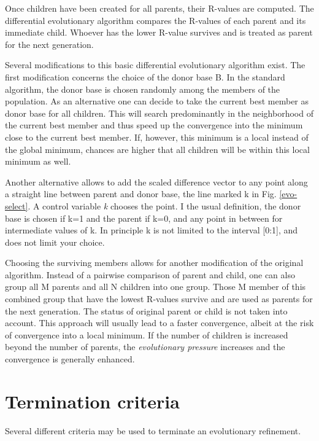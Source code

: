 Once children have been created for all parents, their R-values are 
computed. The differential evolutionary algorithm compares the 
R-values of each parent and its immediate child. Whoever has the 
lower R-value survives and is treated as parent for the next generation.

Several modifications to this basic differential evolutionary
algorithm exist. The first modification concerns the choice of the
donor base B. In the standard algorithm, the donor base is chosen
randomly among the members of the population. As an alternative one
can decide to take the current best member as donor base for all
children. This will search predominantly in the neighborhood of the
current best member and thus speed up the convergence into the 
minimum close to the current best member. If, however, this minimum
is a local instead of the global minimum, chances are higher that 
all children will be within this local minimum as well.

Another alternative allows to add the scaled difference vector to
any point along a straight line between parent and donor base, the 
line marked k in Fig. \ref{evo-select}. A control variable 
{\em k} chooses the point. I the usual definition, the donor base 
is chosen if k=1 and the parent if k=0, and any point in between
for intermediate values of k. In principle k is not limited to 
the interval [0:1], and \Diffev does not limit your choice. 

Choosing the surviving members allows for another modification of the
original algorithm. Instead of a pairwise comparison of parent and
child, one can also group all M parents and all N children into one group.
Those M member of this combined group that have the lowest R-values
survive and are used as parents for the next generation. The status of
original parent or child is not taken into account. This approach will
usually lead to a faster convergence, albeit at the risk of convergence 
into a local minimum. If the number of children is increased 
beyond the number of parents, the 
{\em evolutionary pressure} increases and the convergence is generally
enhanced.


\section{Termination criteria \label{diff-term}}

Several different criteria may be used to terminate an evolutionary
refinement. 

